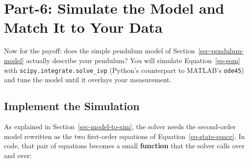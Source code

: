 \documentclass[
  12pt,
  letterpaper,
]{article}
\begin{document}
\newpage{}

\section{Part-6: Simulate the Model and Match It to Your
Data}\label{sec-part-6}

Now for the payoff: does the simple pendulum model of
Section~\ref{sec-pendulum-model} actually describe your pendulum? You
will simulate Equation~\ref{eq-eom} with
\texttt{scipy.integrate.solve\_ivp} (Python's counterpart to MATLAB's
\texttt{ode45}) and tune the model until it overlays your measurement.

\subsection{Implement the Simulation}\label{implement-the-simulation}

As explained in Section~\ref{sec-model-to-sim}, the solver needs the
second-order model rewritten as the two first-order equations of
Equation~\ref{eq-state-space}. In code, that pair of equations becomes a
small \textbf{function} that the solver calls over and over:
\end{document}

